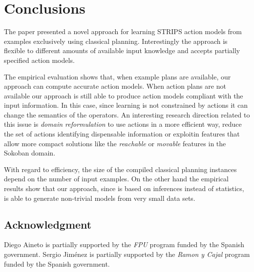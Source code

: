 \documentclass[letterpaper]{article} %
\begin{document}
\section{Conclusions}
The paper presented a novel approach for learning STRIPS action models from examples exclusively using classical planning. Interestingly the approach is flexible to different amounts of available input knowledge and accepts partially specified action models.   

The empirical evaluation shows that, when example plans are available, our approach can compute accurate action models. When action plans are not available our approach is still able to produce action models compliant with the input information. In this case, since learning is not constrained by actions it can change the semantics of the operators. An interesting research direction related to this issue is {\em domain reformulation} to use actions in a more efficient way, reduce the set of actions identifying dispensable information or exploitin features that allow more compact solutions like the {\em reachable} or {\em movable} features in the Sokoban domain. 

With regard to efficiency, the size of the compiled classical planning instances depend on the number of input examples. On the other hand the empirical results show that our approach, since is based on inferences instead of statistics, is able to generate non-trivial models from very small data sets.

\subsection*{Acknowledgment}
\begin{small}
Diego Aineto is partially supported by the {\it FPU} program funded by the Spanish government. Sergio Jim\'enez is partially supported by the {\it Ramon y Cajal} program funded by the Spanish government.
\end{small}

\newpage



\end{document}
